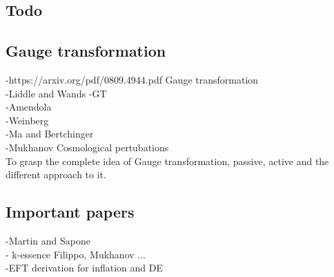 \documentclass[a4paper,14pt]{article}
\begin{document}

\begin{appendices}
\section{Todo}
\subsection{ Gauge transformation}
-https://arxiv.org/pdf/0809.4944.pdf Gauge transformation \\
-Liddle and Wands -GT \\
-Amendola \\
-Weinberg \\
-Ma and Bertchinger \\ 
-Mukhanov Cosmological pertubations \\
To grasp the complete idea of Gauge transformation, passive, active and the different approach to it.\\
\subsection{Important papers}
-Martin and Sapone \\
- k-essence Filippo, Mukhanov ... \\
-EFT derivation for inflation and DE \\

\end{appendices}
\end{document}
